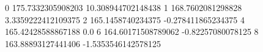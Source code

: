 0 175.7332305908203 10.308944702148438
1 168.7602081298828 3.3359222412109375
2 165.1458740234375 -0.278411865234375
4 165.42428588867188 0.0
6 164.60171508789062 -0.82257080078125
8 163.88893127441406 -1.5353546142578125
